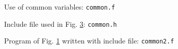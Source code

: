 \documentclass[11pt,oneside]{amsart}
\begin{document}
\begin{figure}

\caption{Use of common variables: {\tt common.f}}
\label{common}
\end{figure}

\begin{figure}

\caption{Include file used in Fig. \ref{common3}: {\tt common.h}}
\label{common2}
\end{figure}

\begin{figure}

\caption{Program of Fig. \ref{common} written with include file: {\tt common2.f}}
\label{common3}
\end{figure}
\end{document}

